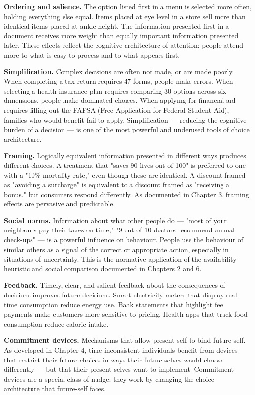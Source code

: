 \documentclass[12pt, letterpaper]{article}
\begin{document}
\textbf{Ordering and salience.} The option listed first in a menu is selected more often, holding everything else equal. Items placed at eye level in a store sell more than identical items placed at ankle height. The information presented first in a document receives more weight than equally important information presented later. These effects reflect the cognitive architecture of attention: people attend more to what is easy to process and to what appears first.

\textbf{Simplification.} Complex decisions are often not made, or are made poorly. When completing a tax return requires 47 forms, people make errors. When selecting a health insurance plan requires comparing 30 options across six dimensions, people make dominated choices. When applying for financial aid requires filling out the FAFSA (Free Application for Federal Student Aid), families who would benefit fail to apply. Simplification --- reducing the cognitive burden of a decision --- is one of the most powerful and underused tools of choice architecture.

\textbf{Framing.} Logically equivalent information presented in different ways produces different choices. A treatment that "saves 90 lives out of 100" is preferred to one with a "10\% mortality rate," even though these are identical. A discount framed as "avoiding a surcharge" is equivalent to a discount framed as "receiving a bonus," but consumers respond differently. As documented in Chapter 3, framing effects are pervasive and predictable.

\textbf{Social norms.} Information about what other people do --- "most of your neighbours pay their taxes on time," "9 out of 10 doctors recommend annual check-ups" --- is a powerful influence on behaviour. People use the behaviour of similar others as a signal of the correct or appropriate action, especially in situations of uncertainty. This is the normative application of the availability heuristic and social comparison documented in Chapters 2 and 6.

\textbf{Feedback.} Timely, clear, and salient feedback about the consequences of decisions improves future decisions. Smart electricity meters that display real-time consumption reduce energy use. Bank statements that highlight fee payments make customers more sensitive to pricing. Health apps that track food consumption reduce caloric intake.

\textbf{Commitment devices.} Mechanisms that allow present-self to bind future-self. As developed in Chapter 4, time-inconsistent individuals benefit from devices that restrict their future choices in ways their future selves would choose differently --- but that their present selves want to implement. Commitment devices are a special class of nudge: they work by changing the choice architecture that future-self faces.
\end{document}
